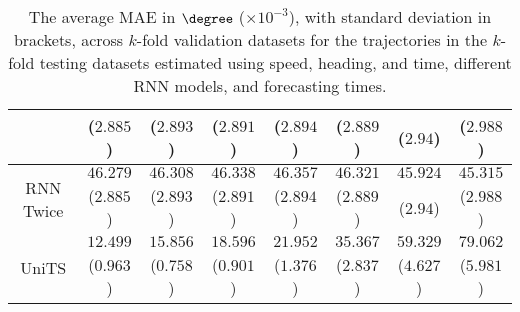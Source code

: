 \begin{table}[!ht]
{\begin{tabular}{|c|c|c|c|c|c|c|c|}
			 & ($2.885$) & ($2.893$) & ($2.891$) & ($2.894$) & ($2.889$) & ($2.94$) & ($2.988$) \\ \hline
			\multirow{2}{*}{RNN Twice} & $46.279$ & $46.308$ & $46.338$ & $46.357$ & $46.321$ & $45.924$ & $45.315$ \\
			 & ($2.885$) & ($2.893$) & ($2.891$) & ($2.894$) & ($2.889$) & ($2.94$) & ($2.988$) \\ \hline
			\multirow{2}{*}{UniTS} & $12.499$ & $15.856$ & $18.596$ & $21.952$ & $35.367$ & $59.329$ & $79.062$ \\
			 & ($0.963$) & ($0.758$) & ($0.901$) & ($1.376$) & ($2.837$) & ($4.627$) & ($5.981$) \\ \hline
		\end{tabular}
	}
	\caption{The average MAE in $\degree$ ($\times 10^{-3}$), with standard deviation in brackets, across $k$-fold validation datasets for the trajectories in the $k$-fold testing datasets estimated using speed, heading, and time, different RNN models, and forecasting times.}
	\label{tab:all_speed_actual_dir_MAE}
\end{table}

